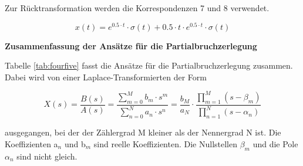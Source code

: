 \noindent Zur Rücktransformation werden die Korrespondenzen 7 und 8 verwendet.

\begin{equation}\label{eq:fourhundredsfiftythree}
x\left(t\right)=e^{0.5\cdot t} \cdot \sigma \left(t\right)+0.5\cdot t\cdot e^{0.5\cdot t} \cdot \sigma \left(t\right)
\end{equation}

\clearpage

{\selectfont
\noindent\textbf{Zusammenfassung der Ansätze für die Partialbruchzerlegung}}\smallskip

\noindent Tabelle \ref{tab:fourfive} fasst die Ansätze für die Partialbruchzerlegung zusammen. Dabei wird von einer Laplace-Transformierten der Form

\begin{equation}\label{eq:fourhundredsfiftyfour}
X\left(s\right)=\frac{B\left(s\right)}{A\left(s\right)} =\frac{\sum _{m=0}^{M}b_{m} \cdot s^{m}  }{\sum _{n=0}^{N}a_{n} \cdot s^{n}  } =\frac{b_{M} }{a_{N} } \cdot \frac{\prod _{m=1}^{M}\left(s-\beta _{m} \right) }{\prod _{n=1}^{N}\left(s-\alpha _{n} \right) }
\end{equation}

\noindent ausgegangen, bei der der Zählergrad M kleiner als der Nennergrad N ist. Die Koeffizienten a$_{n}$ und b$_{m}$ sind reelle Koeffizienten. Die Nullstellen $\beta_{m}$ und die Pole $\alpha_{n}$ sind nicht gleich.

